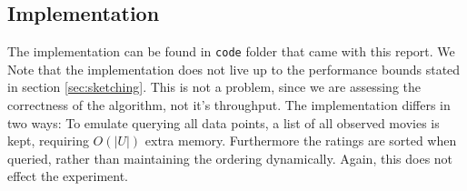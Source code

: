 \subsection{Implementation}
The implementation can be found in \texttt{code} folder that came with this
report. We Note that the implementation does not live up to the performance
bounds stated in section \ref{sec:sketching}. This is not a problem, since we
are assessing the correctness of the algorithm, not it's throughput. The
implementation differs in two ways: To emulate querying all data points, a list
of all observed movies is kept, requiring $O(|U|)$ extra memory. Furthermore the
ratings are sorted when queried, rather than maintaining the ordering
dynamically. Again, this does not effect the experiment.
